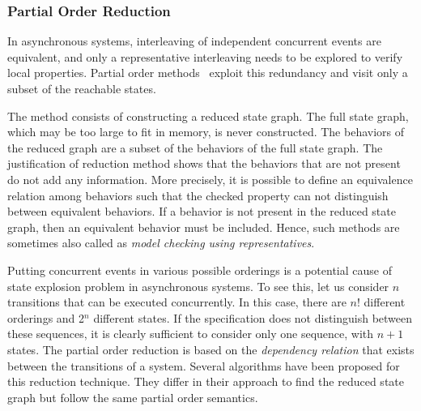 \subsubsection{Partial Order Reduction}
In asynchronous systems, interleaving of independent concurrent
events are equivalent, and only a representative interleaving needs to be 
explored to verify local properties. 
Partial order methods~\cite{godefroid:94,peled:93}
exploit this redundancy and visit only a subset of the reachable states.

\noindent
The method consists of constructing a reduced state graph. The full state 
graph, which may be too large to fit in memory, is never constructed. The 
behaviors of the reduced graph are a subset of the behaviors of the full 
state graph. The justification of reduction method shows that the behaviors 
that are not present do not add any information. More precisely, it is 
possible to define an equivalence relation among behaviors such that the 
checked property can not distinguish between equivalent behaviors. If a 
behavior is not present in the reduced state graph, then an equivalent 
behavior must be included. Hence, such methods are sometimes also called as 
{\em model checking using representatives}.

\noindent
Putting concurrent events in various possible orderings is a potential 
cause of state explosion problem in asynchronous systems. To see this, let 
us consider $n$ transitions that can be executed concurrently. In this case, 
there are $n!$ different orderings and 2$^n$ different states. If the 
specification does not distinguish between these sequences, it is clearly 
sufficient to consider only one sequence, with $n+1$ states. The partial 
order reduction is based on the {\em dependency relation} that exists 
between  the transitions of a system. Several algorithms have been proposed 
for this reduction technique. They differ in their approach to find the 
reduced state graph but follow the same partial order semantics. 

